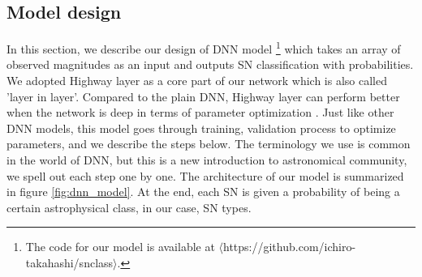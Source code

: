 \documentclass[proof]{pasj01}
\begin{document}
\subsection{Model design}
\label{sec:model} %
In this section, we describe our design of DNN model
\footnote{The code for our model is available at $\langle$https://github.com/ichiro-takahashi/snclass$\rangle$.}
which takes an array of observed magnitudes as an input and outputs SN classification with probabilities.  We adopted Highway layer \citep{srivastava15a} as a core part of our network which is also called 'layer in layer'.  Compared to the plain DNN, Highway layer can perform better when the network is deep in terms of parameter optimization \citep{srivastava15b}.   
Just like other DNN models, this model goes through training, validation process to optimize parameters, and we describe the steps below.  The terminology we use is common in the world of DNN, but this is a new introduction to astronomical community, we spell out each step one by one.  The architecture of our model is summarized in figure \ref{fig:dnn_model}.
At the end, each SN is given a probability of being a certain astrophysical class, in our case, SN types. 
%
\end{document}
